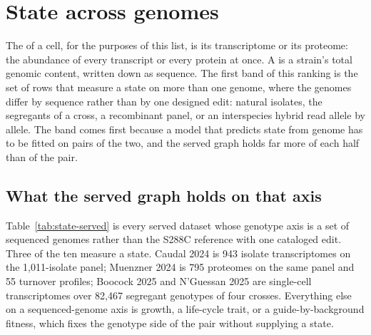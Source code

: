 
\section{State across genomes}\label{sec:state}

The  of a cell, for the purposes of this list, is its transcriptome or its
proteome: the abundance of every transcript or every protein at once. A  is a
strain's total genomic content, written down as sequence. The first band of this ranking
is the set of rows that measure a state on more than one genome, where the genomes differ
by sequence rather than by one designed edit: natural isolates, the segregants of a cross,
a recombinant panel, or an interspecies hybrid read allele by allele. The band comes first
because a model that predicts state from genome has to be fitted on pairs of the two, and
the served graph holds far more of each half than of the pair.

\subsection{What the served graph holds on that axis}\label{sec:state-served}

Table~\ref{tab:state-served} is every served dataset whose genotype axis is a set of
sequenced genomes rather than the S288C reference with one cataloged edit. Three of the
ten measure a state. Caudal 2024 is 943 isolate transcriptomes on the 1,011-isolate panel;
Muenzner 2024 is 795 proteomes on the same panel and 55 turnover profiles; Boocock 2025
and N'Guessan 2025 are single-cell transcriptomes over 82,467 segregant genotypes of four
crosses. Everything else on a sequenced-genome axis is growth, a life-cycle trait, or a
guide-by-background fitness, which fixes the genotype side of the pair without supplying a
state.

